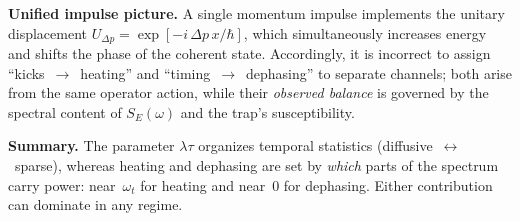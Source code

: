 \noindent\textbf{Unified impulse picture.}
A single momentum impulse implements the unitary displacement
$U_{\Delta p}=\exp[-i\,\Delta p\,x/\hbar]$,
which simultaneously increases energy and shifts the phase of the coherent
state.  Accordingly, it is incorrect to assign ``kicks~$\rightarrow$~heating''
and ``timing~$\rightarrow$~dephasing'' to separate channels; both arise from
the same operator action, while their \emph{observed balance} is governed by
the spectral content of $S_E(\omega)$ and the trap’s susceptibility.

\medskip
\noindent\textbf{Summary.}
The parameter $\lambda\tau$ organizes temporal statistics
(diffusive~$\leftrightarrow$~sparse), whereas heating and dephasing are set by
\emph{which} parts of the spectrum carry power:
near~$\omega_t$ for heating and near~0 for dephasing.
Either contribution can dominate in any regime.
